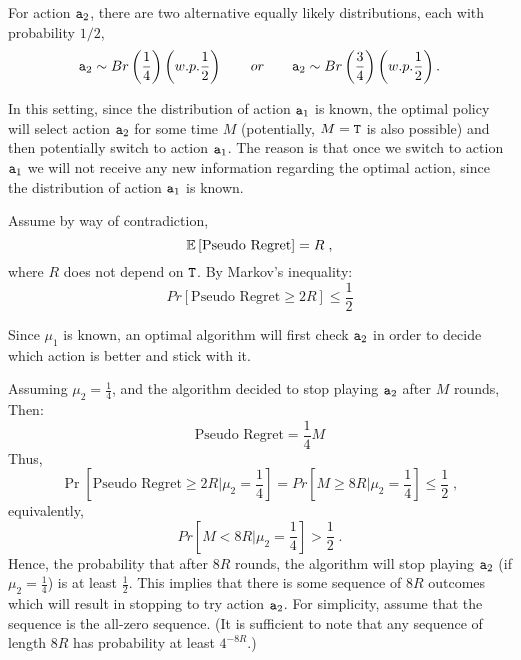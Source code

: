 For action ${\tt a}_2$, there are two alternative equally likely  distributions, each with probability $1/2$,
\[
{\tt a}_{2}\sim Br\left(\frac{1}{4}\right) \left(w.p. \frac{1}{2}\right)
\qquad or \qquad {\tt a}_{2}\sim Br\left(\frac{3}{4}\right) \left(w.p.
\frac{1}{2}\right).
\]

In this setting, since the distribution of action ${\tt a}_1$ is known, the optimal policy will select action ${\tt a}_2$ for some time $M$ (potentially, $M={\tt T}$ is also possible) and then potentially switch to action ${\tt a}_1$. The reason is that once we switch to action ${\tt a}_1$ we will not receive any new information regarding the optimal action, since the distribution of action ${\tt a}_1$ is known. 

Assume by way of contradiction,
\[
\mathbb{E}\left[\text{Pseudo Regret}\right]=R\;,
\]
where $R$ does not depend on ${\tt T}$. By Markov's inequality:
\[
Pr\left[\text{Pseudo Regret}\ge2R\right]\le\frac{1}{2}
\]

Since $\mu_1$ is known, an optimal algorithm will first check ${\tt a}_2$
in order to decide which action is better and stick with it.

Assuming $\mu_2 = \frac{1}{4}$, and the algorithm decided to stop
playing ${\tt a}_2$ after $M$ rounds, Then:
\[
\text{Pseudo Regret} = \frac{1}{4}M
\]
Thus,
\[
\Pr\left[\text{Pseudo Regret}\ge 2R |\mu_2 =\frac{1}{4}\right] = Pr\left[ M\ge 8R |\mu_2 =\frac{1}{4} \right]\le\frac{1}{2} \;,
\]
equivalently,
\[
Pr\left[M < 8R | \mu_2 =\frac{1}{4}\right]>\frac{1}{2}\;.
\]
Hence, the probability that after $8R$ rounds, the algorithm will
stop playing ${\tt a}_2$ (if $\mu_2 = \frac{1}{4}$) is at least
$\frac{1}{2}$. This implies that there is some sequence of $8R$
outcomes which will result in stopping to try action ${\tt a}_2$. For simplicity, assume that the sequence is the all-zero sequence. (It is sufficient to note that any sequence of length $8R$ has probability at least $4^{-8R}$.)



